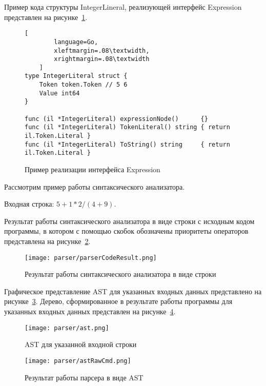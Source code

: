 Пример кода структуры IntegerLineral, реализующей интерфейс Expression представлен на рисунке~\ref{f:code_IExpressionExample}.

\begin{figure}[!htb]
	\centering
	\vspace{\toppaddingoffigure}
	\begin{lstlisting}[
        language=Go,
        xleftmargin=.08\textwidth,
        xrightmargin=.08\textwidth
    ]
type IntegerLiteral struct {
    Token token.Token // 5 6
    Value int64
}

func (il *IntegerLiteral) expressionNode()      {}
func (il *IntegerLiteral) TokenLiteral() string { return il.Token.Literal }
func (il *IntegerLiteral) ToString() string     { return il.Token.Literal }
\end{lstlisting}
	\caption{Пример реализации интерфейса Expression}
	\label{f:code_IExpressionExample}
\end{figure}

Рассмотрим пример работы синтаксического анализатора.

Входная строка: $5 + 1 * 2 / (4 + 9)$.

Результат работы синтаксического анализатора в виде строки с исходным кодом программы,
в котором с помощью скобок обозначены приоритеты операторов представлена на рисунке~\ref{f:parserCodeResult}.

\begin{figure}[ht]
	\centering
	\vspace{\toppaddingoffigure}
	\texttt{[image: parser/parserCodeResult.png]}
	\caption{Результат работы синтаксического анализатора в виде строки}
	\label{f:parserCodeResult}
\end{figure}

Графическое представление AST для указанных входных данных представлено на рисунке~\ref{f:ast}.
Дерево, сформированное в результате работы программы для указанных входных данных представлен на рисунке~\ref{f:astRawCmd}.

\begin{figure}[ht]
	\centering
	\vspace{\toppaddingoffigure}
	\texttt{[image: parser/ast.png]}
	\caption{AST для указанной входной строки}
	\label{f:ast}
\end{figure}

\clearpage

\begin{figure}[!htb]
	\centering
	\texttt{[image: parser/astRawCmd.png]}
	\caption{Результат работы парсера в виде AST}
	\label{f:astRawCmd}
\end{figure}

\clearpage